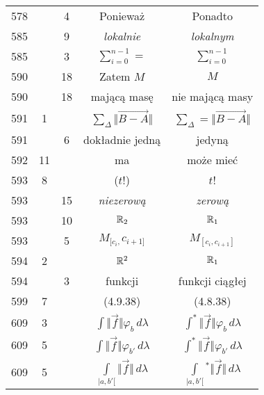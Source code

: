 \documentclass[a4paper,11pt]{article}
\begin{document}
\begin{center}
\begin{tabular}{|c|c|c|c|c|}
    578 & &  4 & Ponieważ & Ponadto \\
    585 & &  9 & \emph{lokalnie} & \emph{lokalnym} \\
    585 & &  3 & $\sum\limits_{ i = 0 }^{ n - 1 } =$
           & $\sum\limits_{ i = 0 }^{ n - 1 }$ \\
    590 & & 18 & Zatem $M$ & $M$ \\
    590 & & 18 & mającą masę & nie mającą masy \\
    591 &  1 & & $\sum\limits_{ \Delta } \Vert \overrightarrow{ B - A } \Vert$
           & $\sum\limits_{ \Delta } = \Vert \overrightarrow{ B - A } \Vert$ \\
    591 & &  6 & dokładnie jedną & jedyną \\
    592 & 11 & & ma & może mieć \\
    593 &  8 & & ($ t $!) & $ t $! \\
    593 & & 15 & \emph{niezerową} & \emph{zerową} \\
    593 & & 10 & $\mathbb{R}_{ 2 }$ & $\mathbb{R}_{ 1 }$ \\
    593 & &  5 & $M_{ [ c_{ i }, } c_{ i + 1 ] }$
           & $M_{ [ c_{ i }, c_{ i + 1 } ] }$ \\
    594 &  2 & & $\mathbb{R}^{ 2 }$ & $\mathbb{R}_{ 1 }$ \\
    594 & &  3 & funkcji & funkcji ciągłej \\
    599 &  7 & & (4.9.38) & (4.8.38) \\
    609 &  3 & & $\int \Vert \vec{ f } \Vert \varphi_{ b } \, d\lambda$
           & $\int^{ * } \Vert \vec{ f } \Vert \varphi_{ b } \, d\lambda$ \\
    609 &  5 & & $\int \Vert \vec{ f } \Vert \varphi_{ b' } \, d\lambda$
           & $\int^{ * } \Vert \vec{ f } \Vert \varphi_{ b' } \, d\lambda$ \\
    609 &  5 & & $\int\limits_{ | a, b' [ } \Vert \vec{ f } \Vert \, d\lambda$
           & $\int\limits_{ | a, b' [ }{^{ * }} \Vert \vec{ f } \Vert \, d\lambda$ \\
    \hline
  \end{tabular}

\end{center}
\end{document}
